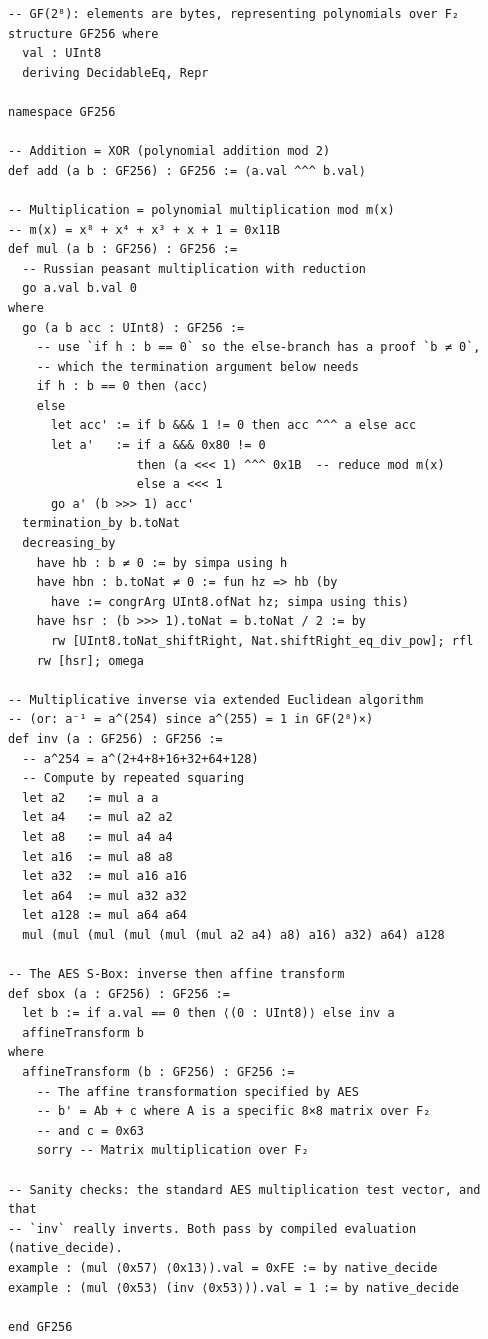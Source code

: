 \documentclass[11pt, a4paper, oneside]{book}
\begin{document}
\begin{leanbox}
\begin{verbatim}
-- GF(2⁸): elements are bytes, representing polynomials over F₂
structure GF256 where
  val : UInt8
  deriving DecidableEq, Repr

namespace GF256

-- Addition = XOR (polynomial addition mod 2)
def add (a b : GF256) : GF256 := ⟨a.val ^^^ b.val⟩

-- Multiplication = polynomial multiplication mod m(x)
-- m(x) = x⁸ + x⁴ + x³ + x + 1 = 0x11B
def mul (a b : GF256) : GF256 :=
  -- Russian peasant multiplication with reduction
  go a.val b.val 0
where
  go (a b acc : UInt8) : GF256 :=
    -- use `if h : b == 0` so the else-branch has a proof `b ≠ 0`,
    -- which the termination argument below needs
    if h : b == 0 then ⟨acc⟩
    else
      let acc' := if b &&& 1 != 0 then acc ^^^ a else acc
      let a'   := if a &&& 0x80 != 0
                  then (a <<< 1) ^^^ 0x1B  -- reduce mod m(x)
                  else a <<< 1
      go a' (b >>> 1) acc'
  termination_by b.toNat
  decreasing_by
    have hb : b ≠ 0 := by simpa using h
    have hbn : b.toNat ≠ 0 := fun hz => hb (by
      have := congrArg UInt8.ofNat hz; simpa using this)
    have hsr : (b >>> 1).toNat = b.toNat / 2 := by
      rw [UInt8.toNat_shiftRight, Nat.shiftRight_eq_div_pow]; rfl
    rw [hsr]; omega

-- Multiplicative inverse via extended Euclidean algorithm
-- (or: a⁻¹ = a^(254) since a^(255) = 1 in GF(2⁸)×)
def inv (a : GF256) : GF256 :=
  -- a^254 = a^(2+4+8+16+32+64+128)
  -- Compute by repeated squaring
  let a2   := mul a a
  let a4   := mul a2 a2
  let a8   := mul a4 a4
  let a16  := mul a8 a8
  let a32  := mul a16 a16
  let a64  := mul a32 a32
  let a128 := mul a64 a64
  mul (mul (mul (mul (mul (mul a2 a4) a8) a16) a32) a64) a128

-- The AES S-Box: inverse then affine transform
def sbox (a : GF256) : GF256 :=
  let b := if a.val == 0 then ⟨(0 : UInt8)⟩ else inv a
  affineTransform b
where
  affineTransform (b : GF256) : GF256 :=
    -- The affine transformation specified by AES
    -- b' = Ab + c where A is a specific 8×8 matrix over F₂
    -- and c = 0x63
    sorry -- Matrix multiplication over F₂

-- Sanity checks: the standard AES multiplication test vector, and that
-- `inv` really inverts. Both pass by compiled evaluation (native_decide).
example : (mul ⟨0x57⟩ ⟨0x13⟩).val = 0xFE := by native_decide
example : (mul ⟨0x53⟩ (inv ⟨0x53⟩)).val = 1 := by native_decide

end GF256
\end{verbatim}
\end{leanbox}
\end{document}
